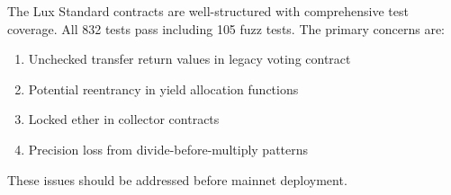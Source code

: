 \documentclass[
]{article}
\providecommand{\tightlist}{%
  \setlength{\itemsep}{0pt}\setlength{\parskip}{0pt}}
\begin{document}
The Lux Standard contracts are well-structured with comprehensive test
coverage. All 832 tests pass including 105 fuzz tests. The primary
concerns are:

\begin{enumerate}
\def\labelenumi{\arabic{enumi}.}
\tightlist
\item
  Unchecked transfer return values in legacy voting contract
\item
  Potential reentrancy in yield allocation functions
\item
  Locked ether in collector contracts
\item
  Precision loss from divide-before-multiply patterns
\end{enumerate}

These issues should be addressed before mainnet deployment.
\end{document}
